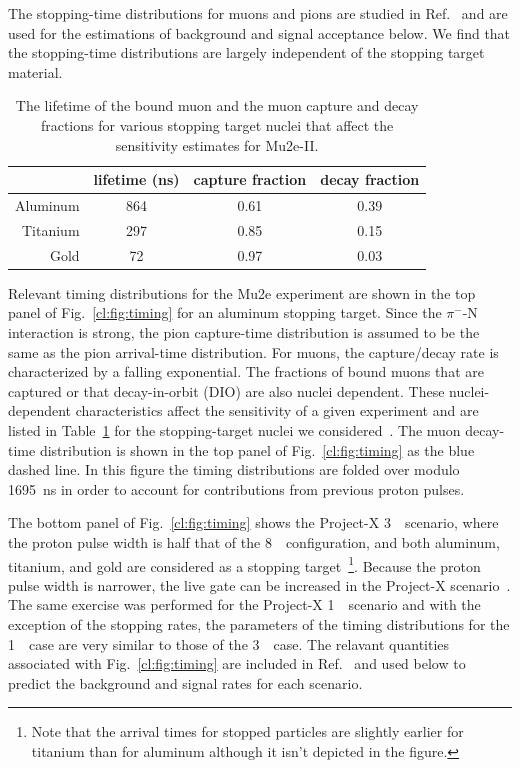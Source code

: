 The stopping-time distributions for muons and pions are studied in
Ref.~\cite{Mu2eII} and are used for the estimations of background and
signal acceptance below.  We find that the stopping-time distributions
are largely independent of the stopping target material.
   

\begin{table}[tb]
  \centering
  \begin{tabular}{rccc} \hline\hline
           & lifetime (ns) & capture fraction & decay fraction \\ \hline
  Aluminum & 864           & 0.61            & 0.39 \\
  Titanium & 297           & 0.85            & 0.15 \\ \hline\hline
  Gold     &  72           & 0.97            & 0.03     \\ \hline\hline
  \end{tabular}
  \caption{The lifetime of the bound muon and the muon capture and decay     
    fractions for various stopping target nuclei that affect the 
    sensitivity estimates for Mu2e-II. 
  }
  \label{cl:tab:nucleistuff}
\end{table}
  
Relevant timing distributions for the Mu2e experiment are shown in the
top panel of Fig.~\ref{cl:fig:timing} for an aluminum stopping
target. Since the $\pi^-$-N interaction is strong, the pion
capture-time distribution is assumed to be the same as the pion
arrival-time distribution.  For muons, the capture/decay rate is
characterized by a falling exponential.  The fractions of bound muons
that are captured or that decay-in-orbit (DIO) are also nuclei
dependent.  These nuclei-dependent characteristics affect the
sensitivity of a given experiment and are listed in
Table~\ref{cl:tab:nucleistuff} for the stopping-target nuclei we
considered~\cite{Suzuki:1987jf}.  The muon decay-time distribution is
shown in the top panel of Fig.~\ref{cl:fig:timing} as the blue dashed
line.  In this figure the timing distributions are folded over modulo
1695~ns in order to account for contributions from previous proton
pulses.

The bottom panel of Fig.~\ref{cl:fig:timing} shows the Project-X
3~\gev\ scenario, where the proton pulse width is half that of the
8~\gev\ configuration, and both aluminum, titanium, and gold are
considered as a stopping target~\footnote{Note that the arrival times
for stopped particles are slightly earlier for titanium than for
aluminum although it isn't depicted in the figure.}. Because the proton
pulse width is narrower, the live gate can be increased in the
Project-X scenario~\cite{MoveLiveGate}.  The same exercise was
performed for the Project-X 1~\gev\ scenario and with the exception of
the stopping rates, the parameters of the timing distributions for the
1~\gev\ case are very similar to those of the 3~\gev\ case.  The
relavant quantities associated with Fig.~\ref{cl:fig:timing} are
included in Ref.~\cite{Mu2eII} and used below to predict the
background and signal rates for each scenario.


